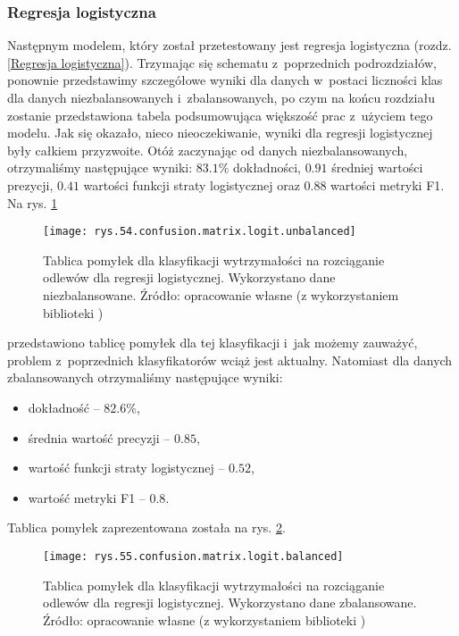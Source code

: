 \subsubsection{Regresja logistyczna}
\label{structures.with.logit}

Następnym modelem, który został przetestowany jest regresja logistyczna (rozdz. \ref{Regresja logistyczna}). Trzymając się schematu z~poprzednich podrozdziałów, ponownie przedstawimy szczegółowe wyniki dla danych w~postaci liczności klas dla danych niezbalansowanych i~zbalansowanych, po czym na końcu rozdziału zostanie przedstawiona tabela podsumowująca większość prac z~użyciem tego modelu. 
Jak się okazało, nieco nieoczekiwanie, wyniki dla regresji logistycznej były całkiem przyzwoite. Otóż zaczynając od danych niezbalansowanych, otrzymaliśmy następujące wyniki: $83.1\%$ dokładności, $0.91$ średniej wartości prezycji, $0.41$ wartości funkcji straty logistycznej oraz $0.88$ wartości metryki F1. Na rys. \ref{rys.54.confusion.matrix.logit.unbalanced} 
\begin{figure}[!h]
    \centering
    \texttt{[image: rys.54.confusion.matrix.logit.unbalanced]}
    \caption{Tablica pomyłek dla klasyfikacji wytrzymałości na rozciąganie odlewów dla regresji logistycznej. Wykorzystano dane niezbalansowane. Źródło: opracowanie własne (z wykorzystaniem biblioteki )}
    \label{rys.54.confusion.matrix.logit.unbalanced}
\end{figure}
przedstawiono tablicę pomyłek dla tej klasyfikacji i~jak możemy zauważyć, problem z~poprzednich klasyfikatorów wciąż jest aktualny.
Natomiast dla danych zbalansowanych otrzymaliśmy następujące wyniki:
\begin{itemize}
	\item dokładność – $82.6\%$,
	\item średnia wartość precyzji – $0.85$,
	\item wartość funkcji straty logistycznej – $0.52$,
	\item wartość metryki F1 – $0.8$.
\end{itemize}
Tablica pomyłek zaprezentowana została na rys. \ref{rys.55.confusion.matrix.logit.balanced}. 
\begin{figure}[!h]
    \centering
    \texttt{[image: rys.55.confusion.matrix.logit.balanced]}
    \caption{Tablica pomyłek dla klasyfikacji wytrzymałości na rozciąganie odlewów dla regresji logistycznej. Wykorzystano dane zbalansowane. Źródło: opracowanie własne (z wykorzystaniem biblioteki )}
    \label{rys.55.confusion.matrix.logit.balanced}
\end{figure}
